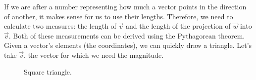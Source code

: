 \documentclass[a4,12pt,twosided,openany]{memoir}
\begin{document}
If we are after a number representing how much a vector points in the direction of another, it makes sense for us to use their lengths. Therefore, we need to calculate two measures: the length of $\overrightarrow{v}$ and the length of the projection of $\overrightarrow{w}$ into $\overrightarrow{v}$. Both of these measurements can be derived using the Pythagorean theorem. Given a vector’s elements (the coordinates), we can quickly draw a triangle. Let’s take $\overrightarrow{v}$, the vector for which we need the magnitude. 
\begin{figure}[h!]
\begin{center}
\end{center}
\caption{Square triangle.}\label{fig:triangle}
\end{figure}
\end{document}
